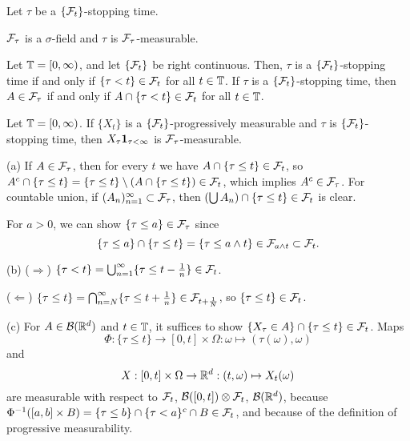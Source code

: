 \documentclass{../../../small}
\begin{document}
\begin{prop}
Let $\tau$ be a $\{\mathcal{F}_t\}$-stopping time.
\begin{parts}
\item $\mathcal{F}_\tau$ is a $\sigma$-field and $\tau$ is $\mathcal{F}_\tau$-measurable.
\item Let $\mathbb{T}=[0,\infty)$, and let $\{\mathcal{F}_t\}$ be right continuous.
Then, $\tau$ is a $\{\mathcal{F}_t\}$-stopping time if and only if $\{\tau<t\}\in\mathcal{F}_t$ for all $t\in\mathbb{T}$.
If $\tau$ is a $\{\mathcal{F}_t\}$-stopping time, then $A\in\mathcal{F}_\tau$ if and only if $A\cap\{\tau<t\}\in\mathcal{F}_t$ for all $t\in\mathbb{T}$.
\item Let $\mathbb{T}=[0,\infty)$.
If $\{X_t\}$ is a $\{\mathcal{F}_t\}$-progressively measurable and $\tau$ is $\{\mathcal{F}_t\}$-stopping time, then $X_\tau\mathbf{1}_{\tau<\infty}$ is $\mathcal{F}_\tau$-measurable.
\end{parts}
\end{prop}
\begin{pf}
(a)
If $A\in\mathcal{F}_\tau$, then for every $t$ we have $A\cap\{\tau\le t\}\in\mathcal{F}_t$, so $A^c\cap\{\tau\le t\}=\{\tau\le t\}\setminus(A\cap\{\tau\le t\})\in\mathcal{F}_t$, which implies $A^c\in\mathcal{F}_\tau$.
For countable union, if $(A_n)_{n=1}^\infty\subset\mathcal{F}_\tau$, then $(\bigcup A_n)\cap\{\tau\le t\}\in\mathcal{F}_t$ is clear.

For $a>0$, we can show $\{\tau\le a\}\in\mathcal{F}_\tau$ since
\[\{\tau\le a\}\cap\{\tau\le t\}=\{\tau\le a\wedge t\}\in\mathcal{F}_{a\wedge t}\subset\mathcal{F}_t.\]

(b)
($\Rightarrow$)
$\{\tau<t\}=\bigcup_{n=1}^\infty\{\tau\le t-\frac1n\}\in\mathcal{F}_t$.

($\Leftarrow$)
$\{\tau\le t\}=\bigcap_{n=N}^\infty\{\tau\le t+\frac1n\}\in\mathcal{F}_{t+\frac1N}$, so $\{\tau\le t\}\in\mathcal{F}_t$.

(c)
For $A\in\mathcal{B}(\mathbb{R}^d)$ and $t\in\mathbb{T}$, it suffices to show $\{X_\tau\in A\}\cap\{\tau\le t\}\in\mathcal{F}_t$.
Maps
\[\Phi:\{\tau\le t\}\to[0,t]\times\Omega:\omega\mapsto(\tau(\omega),\omega)\]
and
\[X:[0,t]\times\Omega\to\mathbb{R}^d:(t,\omega)\mapsto X_t(\omega)\] are measurable with respect to $\mathcal{F}_t$, $\mathcal{B}([0,t])\otimes\mathcal{F}_t$, $\mathcal{B}(\mathbb{R}^d)$, because $\Phi^{-1}([a,b]\times B)=\{\tau\le b\}\cap\{\tau<a\}^c\cap B\in\mathcal{F}_t$, and because of the definition of progressive measurability.
\end{pf}
\end{document}
